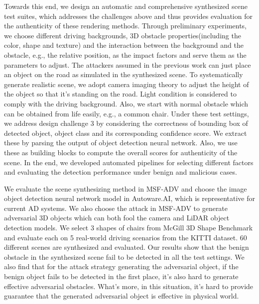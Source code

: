 Towards this end, we design an automatic and comprehensive synthesized scene test suites, which addresses the challenges above and thus provides evaluation for the authenticity of these rendering methods.
Through preliminary experiments, we choose different driving backgrounds, 3D obstacle properties(including the color, shape and texture) and the interaction between the background and the obstacle, 
e.g., the relative position, as the impact factors and serve them as the parameters to adjust.
The attackers assumed in the previous work can just place an object on the road as simulated in the synthesized scene.
To systematically generate realistic scene, we adopt camera imaging theory to adjust the height of the object so that it's standing on the road. 
Light condition is considered to comply with the driving background. 
Also, we start with normal obstacle which can be obtained from life easily, e.g., a common chair.
Under these test settings, we address design challenge 3 by considering the correctness of bounding box of detected object, object class and its corresponding confidence score.
We extract these by parsing the output of object detection neural network. 
Also, we use these as building blocks to compute the overall scores for authenticity of the scene.
In the end, we developed automated pipelines for selecting different factors and evaluating the detection performance under benign and malicious cases.

We evaluate the scene synthesizing method in MSF-ADV\cite{msf-adv} and choose the image object detection neural network model in Autoware.AI\cite{autoware}, which is representative for current AD systems.
We also choose the attack in MSF-ADV\cite{msf-adv} to generate adversarial 3D objects which can both fool the camera and LiDAR object detection models.
We select 3 shapes of chairs from McGill 3D Shape Benchmark\cite{McGill} and evaluate each on 5 real-world driving scenarios from the KITTI dataset\cite{kitti}.
60 different scenes are synthesized and evaluated. 
Our results show that the benign obstacle in the synthesized scene fail to be detected in all the test settings.
We also find that for the attack strategy generating the adversarial object, if the benign object fails to be detected in the first place, 
it's also hard to generate effective adversarial obstacles. 
What's more, in this situation, it's hard to provide guarantee that the generated adversarial object is effective in physical world.

